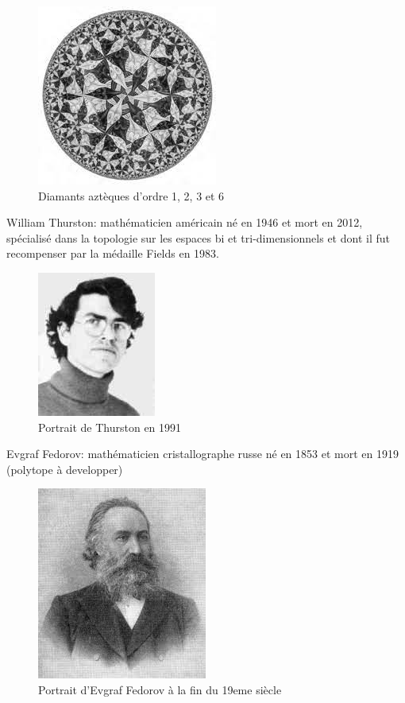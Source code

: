 \documentclass{article}
\begin{document}
\begin{figure} [h]
    \center
    \includegraphics [scale=0.5] {image/dessin3_escher.jpg}
    \caption{Diamants aztèques d'ordre 1, 2, 3 et 6}
\end{figure}

William Thurston: mathématicien américain né en 1946 et mort en 2012, spécialisé dans la topologie sur les espaces bi et tri-dimensionnels et dont il fut recompenser par la médaille Fields en 1983.

\begin{figure} [h]
    \center
    \includegraphics [scale=0.5] {image/thurston.jpg}
    \caption{Portrait de Thurston en 1991}
\end{figure}

Evgraf Fedorov: mathématicien cristallographe russe né en 1853 et mort en 1919 (polytope à developper)

\begin{figure} [h]
    \center
    \includegraphics [scale=0.5] {image/Fedorov.jpg}
    \caption{Portrait d'Evgraf Fedorov à la fin du 19eme siècle}
\end{figure}

\nocite{*}

\end{document}
